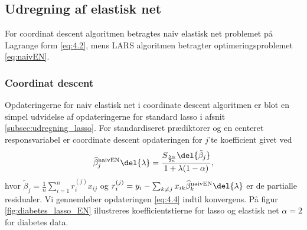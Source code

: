 %
\subsection{Udregning af elastisk net}
For coordinat descent algoritmen betragtes naiv elastisk net problemet på Lagrange form \eqref{eq:4.2}, mens LARS algoritmen betragter optimeringsproblemet \eqref{eq:naivEN}.
%
\subsubsection{Coordinat descent}
Opdateringerne for naiv elastisk net i coordinate descent algoritmen er blot en simpel udvidelse af opdateringerne for standard lasso i afsnit \ref{subsec:udregning_lasso}.
For standardiseret prædiktorer og en centeret responsvariabel er coordinate descent opdateringen for $j$'te koefficient givet ved
\begin{align}
\widehat{\beta}^\text{naivEN}_j \del{\lambda}= \frac{S_{\frac{\lambda \alpha}{2n}} \del{\tilde{\beta}_j}}{1 + \lambda (1-\alpha)}, \label{eq:4.4}
\end{align}
hvor \(\tilde{\beta}_j = \frac{1}{n} \sum_{i=1}^n r_{i}^{(j)} x_{ij}\) og \(r_{i}^{(j)} = y_i - \sum_{k \neq j} x_{ik} \widehat{\beta}^\text{naivEN}_k \del{\lambda}\) er de partialle residualer.
Vi gennemløber opdateringen \eqref{eq:4.4} indtil konvergens.
%
På figur \ref{fig:diabetes_lasso_EN} illustreres koefficientstierne for lasso og elastisk net \(\alpha = 2\) for diabetes data.

